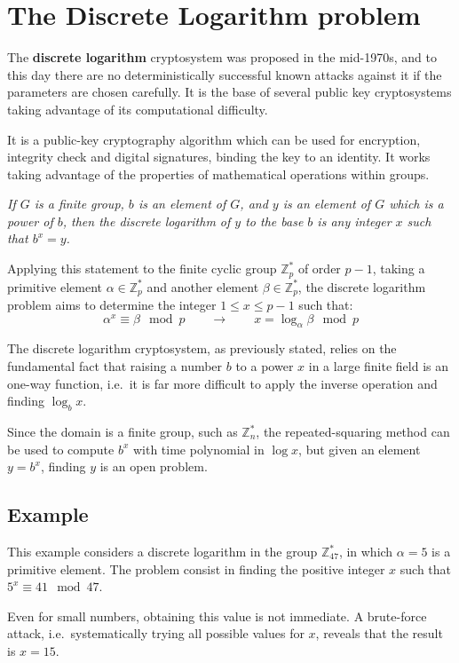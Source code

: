 \section{The Discrete Logarithm problem}
The \textbf{discrete logarithm} cryptosystem was proposed in the mid-1970s, and to this day there are no deterministically successful known attacks against it if the parameters are chosen carefully. It is the base of several public key cryptosystems taking advantage of its computational difficulty.

It is a public-key cryptography algorithm which can be used for encryption, integrity check and digital signatures, binding the key to an identity. It works taking advantage of the properties of mathematical operations within groups.

\textit{If $G$ is a finite group, $b$ is an element of $G$, and $y$ is an element of $G$ which is a power of $b$, then the discrete logarithm of $y$ to the base $b$ is any integer $x$ such that $b^x = y$.}

Applying this statement to the finite cyclic group $\mathbb{Z}^*_p$ of order $p - 1$, taking a primitive element $\alpha \in\mathbb{Z}^*_p$ and another element $\beta \in \mathbb{Z}^*_p$, the discrete logarithm problem aims to determine the integer $1 \leq x \leq p - 1$ such that:
$$\alpha^x \equiv \beta \mod p \qquad \rightarrow \qquad x = \log_\alpha\beta \mod p$$

The discrete logarithm cryptosystem, as previously stated, relies on the fundamental fact that raising a number $b$ to a power $x$ in a large finite field is an one-way function, i.e.\ it is far more difficult to apply the inverse operation and finding $\log_bx$. 

Since the domain is a finite group, such as $\mathbb{Z}^*_n$, the repeated-squaring method can be used to compute $b^x$ with time polynomial in $\log x$, but given an element $y = b^x$, finding $y$ is an open problem.

\subsection{Example}
This example considers a discrete logarithm in the group $\mathbb{Z}^*_{47}$, in which $\alpha = 5$ is a primitive element. The problem consist in finding the positive integer $x$ such that $5^x \equiv 41 \mod 47$.

Even for small numbers, obtaining this value is not immediate. A brute-force attack, i.e.\ systematically trying all possible values for $x$, reveals that the result is $x = 15$.

